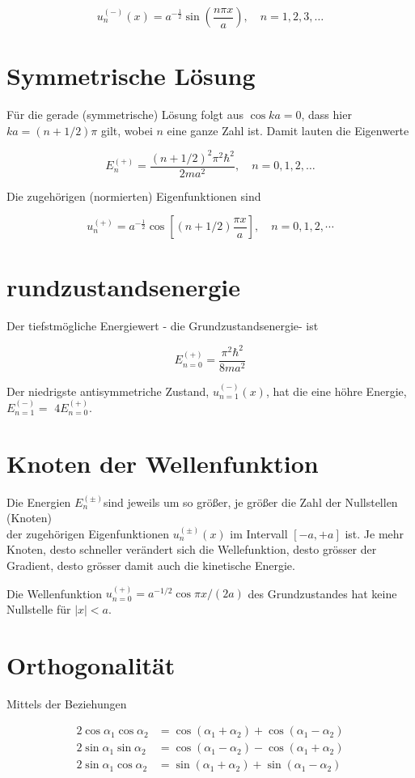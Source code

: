 \documentclass[10pt, letterpaper]{article}
\begin{document}
$$
u_{n}^{(-)}(x)=a^{-\frac{1}{2}} \sin \left(\frac{n \pi x}{a}\right), \quad n=1,2,3, \ldots
$$

\section*{Symmetrische Lösung}
Für die gerade (symmetrische) Lösung folgt aus $\cos k a=0$, dass hier $k a=(n+1 / 2) \pi$ gilt, wobei $n$ eine ganze Zahl ist. Damit lauten die Eigenwerte

$$
E_{n}^{(+)}=\frac{(n+1 / 2)^{2} \pi^{2} \hbar^{2}}{2 m a^{2}}, \quad n=0,1,2, \ldots
$$

Die zugehörigen (normierten) Eigenfunktionen sind

$$
u_{n}^{(+)}=a^{-\frac{1}{2}} \cos \left[(n+1 / 2) \frac{\pi x}{a}\right], \quad n=0,1,2, \cdots
$$

\section*{rundzustandsenergie}
Der tiefstmögliche Energiewert - die Grundzustandsenergie- ist

$$
E_{n=0}^{(+)}=\frac{\pi^{2} \hbar^{2}}{8 m a^{2}}
$$

Der niedrigste antisymmetriche Zustand, $u_{n=1}^{(-)}(x)$, hat die eine höhre Energie, $E_{n=1}^{(-)}=$ $4 E_{n=0}^{(+)}$.

\section*{Knoten der Wellenfunktion}
Die Energien $E_{n}^{( \pm)}$sind jeweils um so größer, je größer die Zahl der Nullstellen (Knoten)\\
der zugehörigen Eigenfunktionen $u_{n}^{( \pm)}(x)$ im Intervall $[-a,+a]$ ist. Je mehr Knoten, desto schneller verändert sich die Wellefunktion, desto grösser der Gradient, desto grösser damit auch die kinetische Energie.

Die Wellenfunktion $u_{n=0}^{(+)}=a^{-1 / 2} \cos \pi x /(2 a)$ des Grundzustandes hat keine Nullstelle für $|x|<a$.

\section*{Orthogonalität}
Mittels der Beziehungen

$$
\begin{aligned}
2 \cos \alpha_{1} \cos \alpha_{2} & =\cos \left(\alpha_{1}+\alpha_{2}\right)+\cos \left(\alpha_{1}-\alpha_{2}\right) \\
2 \sin \alpha_{1} \sin \alpha_{2} & =\cos \left(\alpha_{1}-\alpha_{2}\right)-\cos \left(\alpha_{1}+\alpha_{2}\right) \\
2 \sin \alpha_{1} \cos \alpha_{2} & =\sin \left(\alpha_{1}+\alpha_{2}\right)+\sin \left(\alpha_{1}-\alpha_{2}\right)
\end{aligned}
$$
\end{document}
